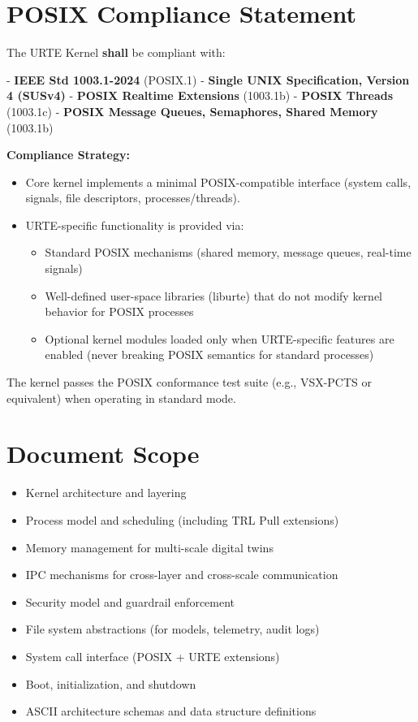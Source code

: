 \documentclass[11pt,a4paper]{report}
\begin{document}
\section{POSIX Compliance Statement}

The URTE Kernel \textbf{shall} be compliant with:

- \textbf{IEEE Std 1003.1-2024} (POSIX.1)
- \textbf{Single UNIX Specification, Version 4 (SUSv4)}
- \textbf{POSIX Realtime Extensions} (1003.1b)
- \textbf{POSIX Threads} (1003.1c)
- \textbf{POSIX Message Queues, Semaphores, Shared Memory} (1003.1b)

\textbf{Compliance Strategy:}
\begin{itemize}
    \item Core kernel implements a minimal POSIX-compatible interface (system calls, signals, file descriptors, processes/threads).
    \item URTE-specific functionality is provided via:
          \begin{itemize}
              \item Standard POSIX mechanisms (shared memory, message queues, real-time signals)
              \item Well-defined user-space libraries (liburte) that do not modify kernel behavior for POSIX processes
              \item Optional kernel modules loaded only when URTE-specific features are enabled (never breaking POSIX semantics for standard processes)
          \end{itemize}
\end{itemize}

The kernel passes the POSIX conformance test suite (e.g., VSX-PCTS or equivalent) when operating in standard mode.

\section{Document Scope}

\begin{itemize}
    \item Kernel architecture and layering
    \item Process model and scheduling (including TRL Pull extensions)
    \item Memory management for multi-scale digital twins
    \item IPC mechanisms for cross-layer and cross-scale communication
    \item Security model and guardrail enforcement
    \item File system abstractions (for models, telemetry, audit logs)
    \item System call interface (POSIX + URTE extensions)
    \item Boot, initialization, and shutdown
    \item ASCII architecture schemas and data structure definitions
\end{itemize}
\end{document}
